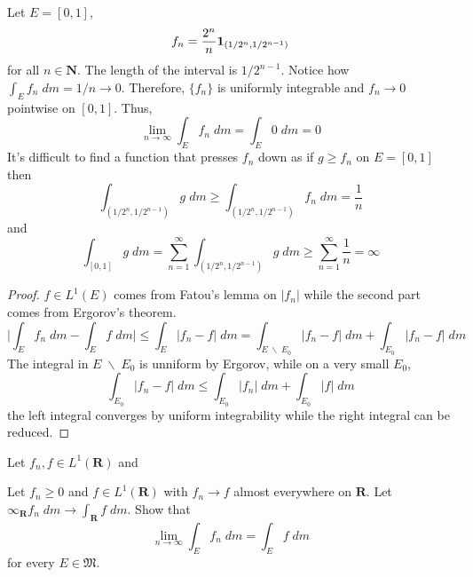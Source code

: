  \vspace{2ex}
\begin{ex}
Let $E=[0,1]$, 
\[f_{n}=\dfrac{2^{n}}{n}{\bf 1}_{(1/2^{n},1/2^{n-1})}\]
for all $n\in {\bm N}$. The length of the interval is $1/2^{n-1}$. Notice how $\int _{E}f_{n}\;d m=1/n\rightarrow 0$. Therefore, $\{f_{n}\}$ is uniformly integrable and $f_{n}\rightarrow 0$ pointwise on $[0,1]$. Thus,
\[\lim _{n\rightarrow \infty }\int _{E}f_{n}\;d m=\int _{E}0\;d m=0\]
It's difficult to find a function that presses $f_{n}$ down as if $g\geq f_{n}$ on $E=[0,1]$ then
\[\int _{(1/2^{n},1/2^{n-1})}g\;d m\geq \int _{(1/2^{n},1/2^{n-1})}f_{n}\;d m=\dfrac{1}{n}\]
and
\[\int _{[0,1]}g\;d m=\sum ^{\infty }_{n=1}\int _{(1/2^{n},1/2^{n-1})}g\;d m\geq \sum^{\infty }_{n=1}\dfrac{1}{n}=\infty \]
\end{ex}
\vspace{2ex}
\begin{proof}
$f\in  L^{1}(E)$ comes from Fatou's lemma on $|f_{n}|$ while the second part comes from Ergorov's theorem. 
\[\Big|\int _{E}f_{n}\;d m-\int _{E}f\;d m\Big|\leq \int _{E}|f_{n}-f|\; dm=\int _{E\;\backslash\;E_0}|f_{n}-f|\;d m+\int _{E_0}|f_{n}-f|\;d m\]
The integral in $E\;\backslash\;E_0$ is unniform by Ergorov, while on a very small $E_0$,
\[\int _{E_0}|f_{n}-f|\;d m\leq \int _{E_0}|f_{n}|\;d m+\int _{E_0}|f|\;d m\]
the left integral converges by uniform integrability while the right integral can be reduced.
\end{proof}
\vspace{2ex}
\begin{ex}
Let $f_{n},f\in L^{1}({\bm R})$ and 
\end{ex}
\vspace{2ex}
\begin{ex}
Let $f_{n}\geq 0$ and $f\in L^{1}({\bm R})$ with $f_{n}\rightarrow f$ almost everywhere on ${\bm R}$. Let $\infty _{{\bm R}}f_{n}\;d m\rightarrow \int _{{\bm R}}f\; dm$. Show that 
\[\lim _{n\rightarrow \infty }\int _{E}f_{n}\;d m=\int _{E}f\;d m\]
for every $E\in \mathfrak{M}$.
\end{ex}
\vspace{2ex}

